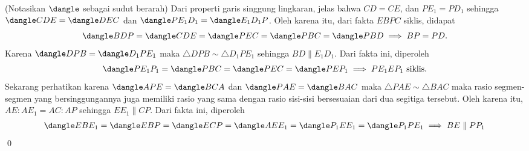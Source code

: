 (Notasikan $\dangle$ sebagai sudut berarah)
Dari properti garis singgung lingkaran, jelas bahwa $CD=CE$, dan $PE_1=PD_1$ sehingga $\dangle CDE = \dangle DEC$ dan $\dangle PE_1D_1 = \dangle E_1D_1P$. 
Oleh karena itu, dari fakta $EBPC$ siklis, didapat
\begin{align*}
    \dangle BDP = \dangle CDE = \dangle PEC = \dangle PBC = \dangle PBD \implies BP = PD.
\end{align*}
Karena $\dangle DPB = \dangle D_1PE_1$ maka $\triangle DPB \sim \triangle D_1PE_1$ sehingga $BD \parallel E_1D_1$. Dari fakta ini, diperoleh
\begin{align*}
    \dangle PE_1P_1 = \dangle PBC = \dangle PEC = \dangle PEP_1 \implies PE_1EP_1 \text{ siklis}.
\end{align*}
Sekarang perhatikan karena $\dangle APE = \dangle BCA$ dan $\dangle PAE = \dangle BAC$ 
maka $\triangle PAE \sim \triangle BAC$ maka rasio segmen-segmen yang bersinggungannya juga memiliki rasio yang sama dengan rasio sisi-sisi bersesuaian dari dua segitiga tersebut.
Oleh karena itu, $AE:AE_1 = AC:AP$ sehingga $EE_1 \parallel CP$. Dari fakta ini, diperoleh
\begin{align*}
    \dangle EBE_1 = \dangle EBP = \dangle ECP = \dangle AEE_1 = \dangle P_1EE_1 = \dangle P_1PE_1 \implies BE \parallel PP_1
\end{align*} \qed
